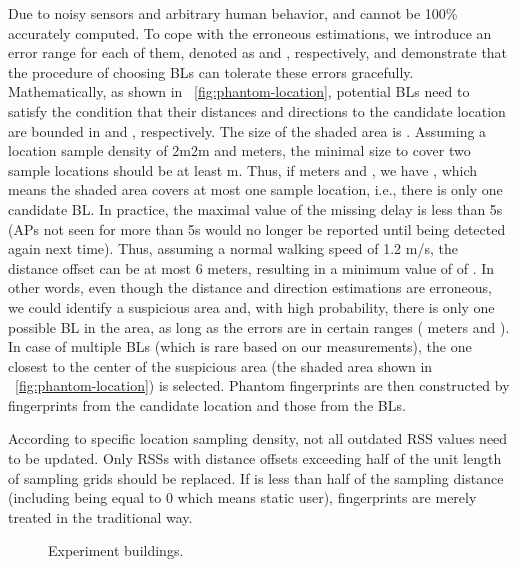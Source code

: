 \documentclass[10pt,conference,compsocconf,letterpaper]{./sty/IEEEtran}
\newcommand{\rev}[1]{{\color{blue}#1}} \newcommand{\com}[1]{\textbf{\color{red}(COMMENT: #1)}} \else
\newcommand{\rev}[1]{#1}
\newcommand{\com}[1]{}
\begin{document}
Due to noisy sensors and arbitrary human behavior,  and  cannot be 100\% accurately computed. To cope with the erroneous estimations, we introduce an error range for each of them, denoted as  and , respectively, and demonstrate that the procedure of choosing BLs can tolerate these errors gracefully. Mathematically, as shown in \figurename~\ref{fig:phantom-location}, potential BLs \rev{need to satisfy the condition} that their distances and directions to the candidate location are bounded in  and , respectively. The size of the shaded area is . 
Assuming a location sample density of 2m2m and  meters, the minimal size  to cover two sample locations should be at least  m. Thus, if  meters and , we have , which means the shaded area covers at most one sample location, i.e., there is only one candidate BL. 
In practice, the maximal value of the missing delay  is less than 5s (APs not seen for more than 5s would no longer be reported until being detected again next time). Thus, assuming a normal walking speed of 1.2 m/s, the distance offset can be at most 6 meters, resulting in a minimum value of  of . In other words, even though the distance and direction estimations are erroneous, we could identify a suspicious area and, with high probability, there is only one possible BL in the area, as long as the errors are in certain ranges ( meters and ). 
In case of multiple BLs (which is rare based on our measurements), the one closest to the center of the suspicious area (the shaded area shown in \figurename~\ref{fig:phantom-location}) is selected. Phantom fingerprints are then constructed by fingerprints from the candidate location and those from the BLs.

According to specific location sampling density, not all outdated RSS values need to be updated. Only RSSs with distance offsets  exceeding half of the unit length of sampling grids should be replaced. If  is less than half of the sampling distance (including being equal to 0 which means static user), fingerprints are merely treated in the traditional way. 
















\begin{figure*}[t]
	\centering	
		\hspace{0.5in}
		\hfill
	\caption{Experiment buildings.}
	\label{fig:floorplan}
\end{figure*}
\end{document}
